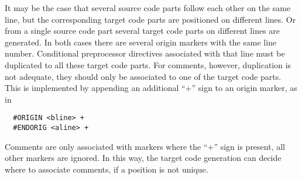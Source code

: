 It may be the case that several source code parts follow each other on the same line, but the corresponding target code
parts are positioned on different lines. Or from a single source code part several target code parts on different lines 
are generated. In both cases there are several origin markers with the same line number. Conditional preprocessor directives
associated with that line must be duplicated to all these target code parts. For comments, however, duplication is not
adequate, they should only be associated to one of the target code parts. This is implemented by appending an additional 
``+'' sign to an origin marker, as in 
\begin{verbatim}
  #ORIGIN <bline> +
  #ENDORIG <aline> +
\end{verbatim}
Comments are only associated with markers where the ``+'' sign is present, all other markers are ignored. In this way,
the target code generation can decide where to associate comments, if a position is not unique.

